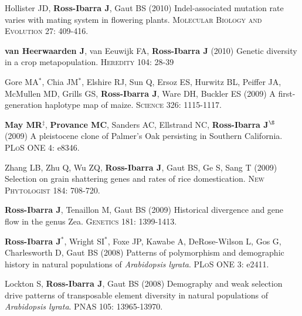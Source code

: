 \documentclass[letterpaper]{article}
\begin{document}
\begin{etaremune}
\vspace{-2ex}
\item Hollister JD, {\bf Ross-Ibarra J}, Gaut BS (2010) Indel-associated mutation rate varies with mating system in flowering plants.  \textsc{Molecular Biology and Evolution} 27: 409-416.

\vspace{-2ex}
\item {\bf van Heerwaarden J}, van Eeuwijk FA, {\bf Ross-Ibarra J} (2010) Genetic diversity in a crop metapopulation.  \textsc{Heredity} 104: 28-39

\vspace{-2ex}
\item Gore MA$^*$, Chia JM$^*$, Elshire RJ, Sun Q, Ersoz ES, Hurwitz BL, Peiffer JA, McMullen MD, Grills GS, {\bf Ross-Ibarra J}, Ware DH, Buckler ES (2009) A first-generation haplotype map of maize.  \textsc{Science 326}: 1115-1117.

\vspace{-2ex}
\item {\bf May MR}$^\ddagger$, {\bf Provance MC}, Sanders AC, Ellstrand NC, {\bf Ross-Ibarra J}$^\S$ (2009) A pleistocene clone of Palmer's Oak persisting in Southern California.  \textsc{PLoS ONE} 4: e8346.

\vspace{-2ex}
\item Zhang LB, Zhu Q, Wu ZQ, {\bf Ross-Ibarra J}, Gaut BS, Ge S, Sang T (2009) Selection on grain shattering genes and rates of rice domestication.  \textsc{New Phytologist} 184: 708-720.
\item {\bf Ross-Ibarra J}, Tenaillon M, Gaut BS (2009) Historical divergence and gene flow in the genus Zea.  \textsc{Genetics} 181: 1399-1413.

\vspace{-2ex}
\item {\bf Ross-Ibarra J}$^*$, Wright SI$^*$, Foxe JP, Kawabe A, DeRose-Wilson L, Gos G, Charlesworth D, Gaut BS (2008) Patterns of polymorphism and demographic history in natural populations of \emph{Arabidopsis lyrata}.  \textsc{PLoS ONE} 3: e2411.

\vspace{-2ex}
\item Lockton S, {\bf Ross-Ibarra J}, Gaut BS (2008) Demography and weak selection drive patterns of transposable element diversity in natural populations of \emph{Arabidopsis lyrata}. PNAS 105: 13965-13970.


\end{etaremune}
\end{document}
